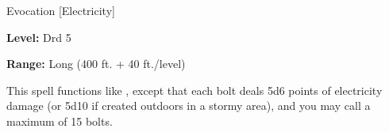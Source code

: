 
Evocation [Electricity]

\textbf{Level:} Drd 5

\textbf{Range:} Long (400 ft. + 40 ft./level)

This spell functions like , except that each bolt deals 
5d6 points of electricity damage (or 5d10 if created outdoors in a stormy area), 
and you may call a maximum of 15 bolts.

